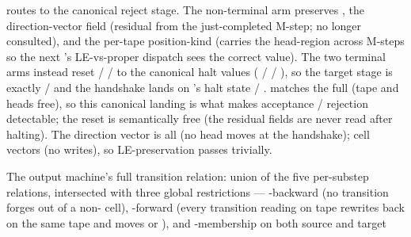 \begin{isabellebody}
{     routes to the canonical reject stage.  The non-terminal
     arm preserves , the direction-vector field
      (residual from the just-completed M-step; no
     longer consulted), and the per-tape position-kind
      (carries the head-region across M-steps so the
     next 's LE-vs-proper dispatch sees the
     correct value).  The two terminal arms instead reset
      /  /  to the canonical
     halt values ( /  / ), so the target stage
     is exactly  /
      and the handshake lands
     on 's halt state  / .   matches the full 
     (tape and heads free), so this canonical landing is what
     makes  acceptance / rejection detectable; the reset
     is semantically free (the residual fields are never read
     after halting).  The direction vector is all 
     (no head moves at the handshake); cell vectors
      (no writes), so LE-preservation passes
     trivially.%
}%
\begin{isamarkuptext}%
The output machine's full transition relation: union of
  the five per-substep relations, intersected with three global
  restrictions — -backward (no transition forges
   out of a non- cell),
  -forward (every transition reading 
  on tape  rewrites  back on the same tape
  and moves  or ), and
  -membership on both source and target

\end{isamarkuptext}
\end{isabellebody}
